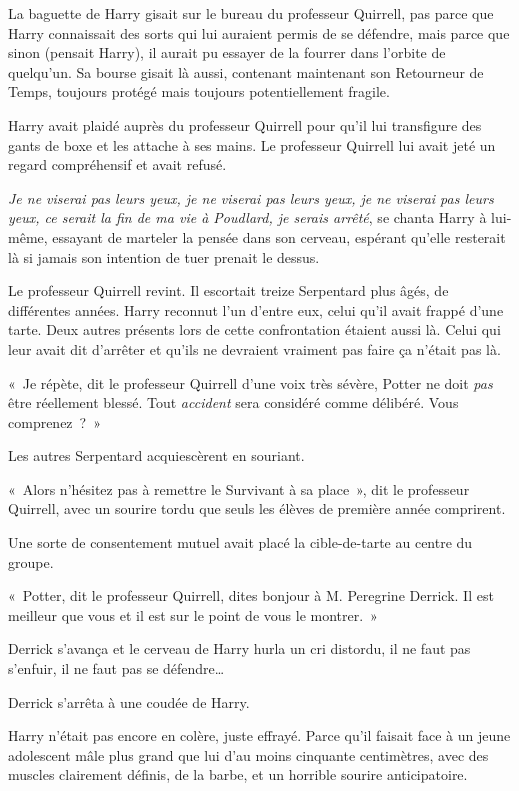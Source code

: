 La baguette de Harry gisait sur le bureau du professeur Quirrell, pas parce que Harry connaissait des sorts qui lui auraient permis de se défendre, mais parce que sinon (pensait Harry), il aurait pu essayer de la fourrer dans l'orbite de quelqu'un. Sa bourse gisait là aussi, contenant maintenant son Retourneur de Temps, toujours protégé mais toujours potentiellement fragile.

Harry avait plaidé auprès du professeur Quirrell pour qu'il lui transfigure des gants de boxe et les attache à ses mains. Le professeur Quirrell lui avait jeté un regard compréhensif et avait refusé.

\emph{Je ne viserai pas leurs yeux, je ne viserai pas leurs yeux, je ne viserai pas leurs yeux, ce serait la fin de ma vie à Poudlard, je serais arrêté}, se chanta Harry à lui-même, essayant de marteler la pensée dans son cerveau, espérant qu'elle resterait là si jamais son intention de tuer prenait le dessus.

Le professeur Quirrell revint. Il escortait treize Serpentard plus âgés, de différentes années. Harry reconnut l'un d'entre eux, celui qu'il avait frappé d'une tarte. Deux autres présents lors de cette confrontation étaient aussi là. Celui qui leur avait dit d'arrêter et qu'ils ne devraient vraiment pas faire ça n'était pas là.

«~Je répète, dit le professeur Quirrell d'une voix très sévère, Potter ne doit \emph{pas} être réellement blessé. Tout \emph{accident} sera considéré comme délibéré. Vous comprenez~?~»

Les autres Serpentard acquiescèrent en souriant.

«~Alors n'hésitez pas à remettre le Survivant à sa place~», dit le professeur Quirrell, avec un sourire tordu que seuls les élèves de première année comprirent.

Une sorte de consentement mutuel avait placé la cible-de-tarte au centre du groupe.

«~Potter, dit le professeur Quirrell, dites bonjour à M. Peregrine Derrick. Il est meilleur que vous et il est sur le point de vous le montrer.~»

Derrick s'avança et le cerveau de Harry hurla un cri distordu, il ne faut pas s'enfuir, il ne faut pas se défendre…

Derrick s'arrêta à une coudée de Harry.

Harry n'était pas encore en colère, juste effrayé. Parce qu'il faisait face à un jeune adolescent mâle plus grand que lui d'au moins cinquante centimètres, avec des muscles clairement définis, de la barbe, et un horrible sourire anticipatoire.

